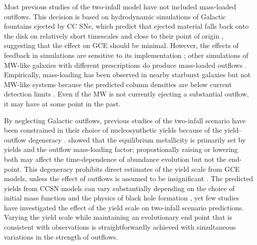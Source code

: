 \documentclass[twocolumn,twocolappendix,linenumbers]{aastex631}
\newcommand{\todo}[1]{{\color{red}#1}}
\begin{document}
Most previous studies of the two-infall model have not included mass-loaded outflows. This decision is based on hydrodynamic simulations of Galactic fountains ejected by CC SNe, which predict that ejected material falls back onto the disk on relatively short timescales \citep{spitoni_galactic_2008,spitoni_effects_2009} and close to their point of origin \citep{melioli_hydrodynamical_2008,melioli_hydrodynamical_2009}, suggesting that the effect on GCE should be minimal. However, the effects of feedback in simulations are sensitive to its implementation \citep[e.g.,][]{li_effects_2020,hu_code_2023}; other simulations of MW-like galaxies with different prescriptions do produce mass-loaded outflows \citep[e.g.,][]{brook_hierarchical_2011,gutcke_nihao_2017,nelson_first_2019,peschken_angular_2021,kopenhafer_seeking_2023}. Empirically, mass-loading has been observed in nearby starburst galaxies \citep[e.g.,][]{lopez_temperature_2020,cameron_duvet_2021,lopez_x-ray_2023} but not MW-like systems because the predicted column densities are below current detection limits \citep[see reviews by][]{veilleux_cool_2020,thompson_theory_2024}. Even if the MW is not currently ejecting a substantial outflow, it may have at some point in the past.

By neglecting Galactic outflows, previous studies of the two-infall scenario have been constrained in their choice of nucleosynthetic yields \citep{francois_evolution_2004} because of the yield--outflow degeneracy \citep[e.g.,][]{hartwick_chemical_1976,cooke_primordial_2022,johnson_dwarf_2023,sandford_strong_2024}. \citet{weinberg_equilibrium_2017} showed that the equilibrium metallicity is primarily set by yields and the outflow mass-loading factor; proportionally raising or lowering both may affect the time-dependence of abundance evolution but not the end-point. This degeneracy prohibits direct estimates of the yield scale from GCE models, unless the effect of outflows is assumed to be insignificant \citep[e.g.,][]{francois_evolution_2004}.
The predicted yields from CCSN models can vary substantially depending on the choice of initial mass function \citep{vincenzo_modern_2016} and the physics of black hole formation \citep{griffith_impact_2021}, yet few studies have investigated the effect of the yield scale on two-infall scenario predictions. Varying the yield scale while maintaining an evolutionary end point that is consistent with observations is straightforwardly achieved with simultaneous variations in the strength of outflows.
\end{document}
